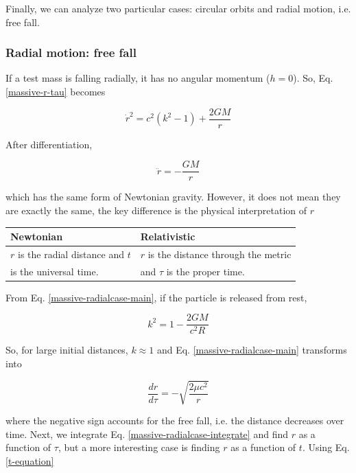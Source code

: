 \documentclass[letterpaper,11pt,onecolumn]{article}
\begin{document}
Finally, we can analyze two particular cases: circular orbits and radial motion, i.e. free fall. 

\subsubsection{Radial motion: free fall}

If a test mass is falling radially, it has no angular momentum ($h=0$). So, Eq. \ref{massive-r-tau} becomes 

\begin{equation} \label{massive-radialcase-main}
    \dot{r}^2 = c^2(k^2-1) + \frac{2GM}{r}
\end{equation}

After differentiation, 

\begin{equation*}
    \ddot{r} = - \frac{GM}{r}
\end{equation*}

which has the same form of Newtonian gravity. However, it does not mean they are exactly the same, the key difference is the physical interpretation of $r$

\begin{table}[h!]
    \centering
    \begin{tabular}{l|l}
         Newtonian & Relativistic  \\ \hline
         $r$ is the radial distance and $t$ & $r$ is the distance through the metric \\
         is the universal time. & and $\tau$ is the proper time. 
    \end{tabular}
\end{table}


From Eq. \ref{massive-radialcase-main}, if the particle is released from rest, 

\begin{equation*}
    k^2 = 1 - \frac{2GM}{c^2 R}
\end{equation*}

So, for large initial distances, $k \approx 1$ and Eq. \ref{massive-radialcase-main} transforms into 

\begin{equation} \label{massive-radialcase-integrate}
    \frac{dr}{d\tau} = - \sqrt{\frac{2\mu c^2}{r}}
\end{equation}

where the negative sign accounts for the free fall, i.e. the distance decreases over time. Next, we integrate Eq. \ref{massive-radialcase-integrate} and find $r$ as a function of $\tau$, but a more interesting case is finding $r$ as a function of $t$. Using Eq. \ref{t-equation}
\end{document}
